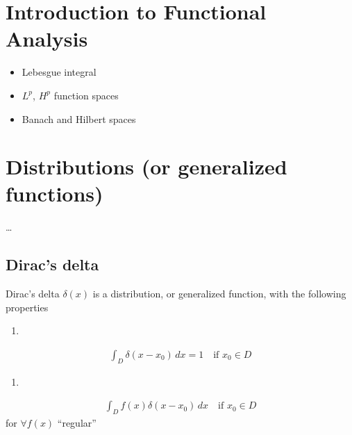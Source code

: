 \documentclass[letterpaper,10pt,english]{jupyterBook}
\begin{document}
\chapter{Introduction to Functional Analysis}
\label{\detokenize{ch/functional-analysis/intro:introduction-to-functional-analysis}}\label{\detokenize{ch/functional-analysis/intro:functional-analysis}}\label{\detokenize{ch/functional-analysis/intro::doc}}\begin{itemize}
\item {} 
\sphinxAtStartPar
Lebesgue integral

\item {} 
\sphinxAtStartPar
\(L^p\), \(H^p\) function spaces

\item {} 
\sphinxAtStartPar
Banach and Hilbert spaces

\end{itemize}

\sphinxstepscope


\chapter{Distributions (or generalized functions)}
\label{\detokenize{ch/functional-analysis/dirac-delta:distributions-or-generalized-functions}}\label{\detokenize{ch/functional-analysis/dirac-delta:functional-analysis-distributions}}\label{\detokenize{ch/functional-analysis/dirac-delta::doc}}
\sphinxAtStartPar
…


\section{Dirac’s delta}
\label{\detokenize{ch/functional-analysis/dirac-delta:dirac-s-delta}}\label{\detokenize{ch/functional-analysis/dirac-delta:functional-analysis-dirac-delta}}
\sphinxAtStartPar
Dirac’s delta \(\delta(x)\) is a distribution, or generalized function, with the following properties
\begin{enumerate}
%
\item {} 
\end{enumerate}
\begin{equation*}
\begin{split}\int_{D} \delta(x-x_0) \, dx = 1  \quad \text{if $x_0 \in D$}\end{split}
\end{equation*}\begin{enumerate}
%
\setcounter{enumi}{1}
\item {} 
\end{enumerate}
\begin{equation*}
\begin{split}\int_{D} f(x) \delta(x-x_0) \, dx \quad \text{if $x_0 \in D$}\end{split}
\end{equation*}
\sphinxAtStartPar
for \(\forall f(x)\) “regular”  
\end{document}
